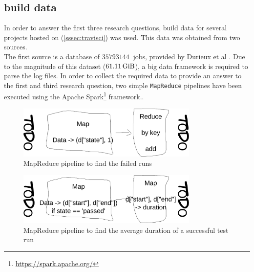 
\subsection{\travisci{} build data}
In order to answer the first three research questions, build data for several projects hosted on \travisci{} (\autoref{sssec:travisci}) was used. This data was obtained from two sources.\\

\noindent The first source is a database of $\SI{35793144}{}$ jobs, provided by Durieux et al \cite{travisanalysis}. Due to the magnitude of this dataset ($\SI{61.11}{\gibi\byte}$), a big data framework is required to parse the log files. In order to collect the required data to provide an answer to the first and third research question, two simple \texttt{MapReduce} pipelines have been executed using the Apache Spark\footnote{\url{https://spark.apache.org/}} framework..\\

\begin{figure}[htbp!]
	\centering
	\includegraphics[width=0.8\textwidth]{assets/images/eval-rq1-mapreduce.pdf}
	\caption{MapReduce pipeline to find the failed runs}
	\label{fig:eval-mapreduce-1}
\end{figure}

\begin{figure}[htbp!]
	\centering
	\includegraphics[width=0.8\textwidth]{assets/images/eval-rq3-mapreduce.pdf}
	\caption{MapReduce pipeline to find the average duration of a successful test run}
	\label{fig:eval-mapreduce-3}
\end{figure}

